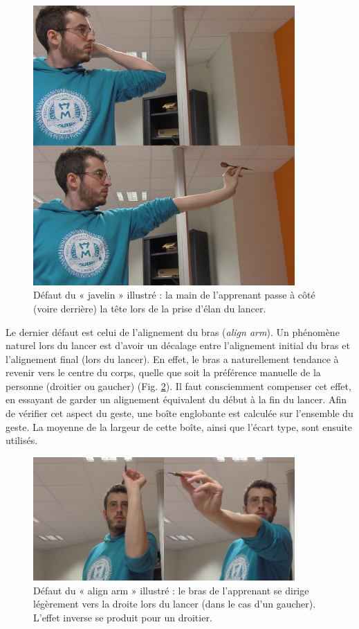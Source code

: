 \begin{figure}
    \centering
    \includegraphics[width=10cm]{pictures/darts_javelin_final.png}
    \caption[Défaut du « javelin » (lancer en javelot)]{Défaut du « javelin » illustré : la main de l'apprenant passe à côté (voire derrière) la tête lors de la prise d'élan du lancer.}
    \label{fig:darts_javelin_final}
\end{figure}

Le dernier défaut est celui de l'alignement du bras (\textit{align arm}). Un phénomène naturel lors du lancer est d'avoir un décalage entre l'alignement initial du bras et l'alignement final (lors du lancer). En effet, le bras a naturellement tendance à revenir vers le centre du corps, quelle que soit la préférence manuelle de la personne (droitier ou gaucher) (Fig. \ref{fig:darts_align_arm_final}). Il faut consciemment compenser cet effet, en essayant de garder un alignement équivalent du début à la fin du lancer. Afin de vérifier cet aspect du geste, une boîte englobante est calculée sur l'ensemble du geste. La moyenne de la largeur de cette boîte, ainsi que l'écart type, sont ensuite utilisés.

\begin{figure}
    \centering
    \includegraphics[width=10cm]{pictures/darts_align_arm_final.png}
    \caption[Défaut du « align arm » (alignement du bras)]{Défaut du « align arm » illustré : le bras de l'apprenant se dirige légèrement vers la droite lors du lancer (dans le cas d'un gaucher). L'effet inverse se produit pour un droitier.}
    \label{fig:darts_align_arm_final}
\end{figure}

